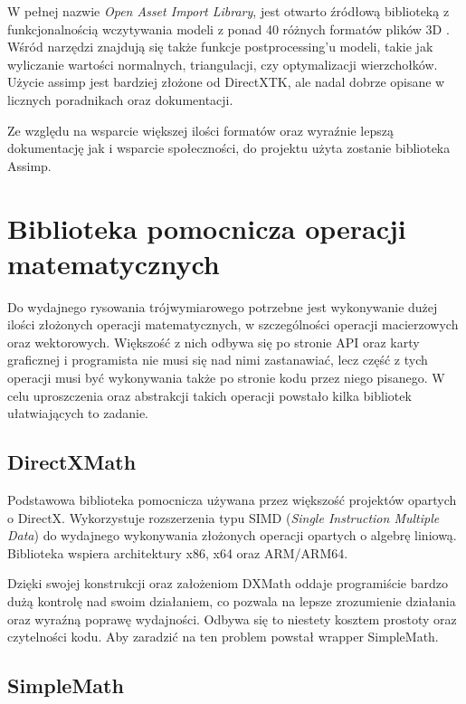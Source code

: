 W pełnej nazwie \emph{Open Asset Import Library}, jest otwarto źródłową
biblioteką z funkcjonalnością wczytywania modeli z ponad 40 różnych
formatów plików 3D \cite{github:assimp:2024}. Wśród narzędzi znajdują się także funkcje
postprocessing'u modeli, takie jak wyliczanie wartości normalnych,
triangulacji, czy optymalizacji wierzchołków. Użycie assimp jest bardziej złożone od DirectXTK, ale nadal dobrze
opisane w licznych poradnikach oraz dokumentacji.

Ze względu na wsparcie większej ilości formatów oraz wyraźnie lepszą
dokumentację jak i wsparcie społeczności, do projektu użyta zostanie
biblioteka Assimp.

\section{Biblioteka pomocnicza operacji matematycznych}

Do wydajnego rysowania trójwymiarowego potrzebne jest wykonywanie dużej
ilości złożonych operacji matematycznych, w szczególności operacji
macierzowych oraz wektorowych. Większość z nich odbywa się po stronie
API oraz karty graficznej i programista nie musi się nad nimi
zastanawiać, lecz część z tych operacji musi być wykonywania także po
stronie kodu przez niego pisanego. W celu uproszczenia oraz abstrakcji
takich operacji powstało kilka bibliotek ułatwiających to zadanie.

\subsection{DirectXMath}

Podstawowa biblioteka pomocnicza używana przez większość projektów
opartych o DirectX. Wykorzystuje rozszerzenia typu SIMD (\emph{Single
Instruction Multiple Data}) do wydajnego wykonywania złożonych operacji
opartych o algebrę liniową. Biblioteka wspiera architektury x86, x64
oraz ARM/ARM64.

Dzięki swojej konstrukcji oraz założeniom DXMath oddaje programiście
bardzo dużą kontrolę nad swoim działaniem, co pozwala na lepsze
zrozumienie działania oraz wyraźną poprawę wydajności. Odbywa się to
niestety kosztem prostoty oraz czytelności kodu. Aby zaradzić na ten
problem powstał wrapper SimpleMath.

\subsection{SimpleMath}


